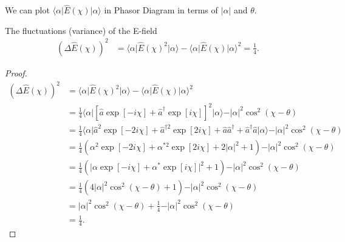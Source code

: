 \documentclass[../../note.tex]{subfiles}
\begin{document}
We can plot $ \langle \alpha \vert \hat{E}(\chi) \vert \alpha \rangle $ in Phasor Diagram in terms of $\vert \alpha \vert$ and $\theta$.

\begin{lemma}
    The fluctuations (variance) of the E-field 
    \begin{align}
        (\Delta \hat{E}(\chi))^2
        &= \langle \alpha \vert \hat{E}(\chi)^2\vert \alpha \rangle - \langle \alpha \vert \hat{E}(\chi) \vert \alpha \rangle^2 = \frac{1}{4}.
    \end{align}
\end{lemma}
\begin{proof}
    \begin{align}
        (\Delta \hat{E}(\chi))^2
        &= \langle \alpha \vert \hat{E}(\chi)^2\vert \alpha \rangle - \langle \alpha \vert \hat{E}(\chi) \vert \alpha \rangle^2 \\
        &= \frac{1}{4} \langle \alpha \vert \left[\hat{a}\exp\left[-i \chi\right] + \hat{a}^\dagger \exp\left[i \chi\right]\right]^2 \vert \alpha \rangle - \vert \alpha \vert^2 \cos^2\left(\chi - \theta \right) \\
        &= \frac{1}{4} \langle \alpha \vert \hat{a}^2 \exp\left[-2 i \chi\right] + \hat{a}^{\dagger 2} \exp\left[2 i \chi \right] + \hat{a} \hat{a}^\dagger + \hat{a}^\dagger \hat{a} \vert \alpha \rangle - \vert \alpha \vert^2 \cos^2\left(\chi - \theta \right) \\
        &= \frac{1}{4} \left(\alpha^2 \exp\left[-2 i \chi\right] + \alpha^{\ast 2} \exp\left[2 i \chi\right] + 2 \vert \alpha \vert^2 + 1 \right) - \vert \alpha \vert^2 \cos^2\left(\chi - \theta \right) \\
        &= \frac{1}{4} \left(\vert \alpha \exp\left[-i \chi \right] + \alpha^\ast \exp\left[i \chi \right]\vert^2 + 1\right) - \vert \alpha \vert^2 \cos^2\left(\chi - \theta \right) \\
        &= \frac{1}{4} \left(4 \vert \alpha \vert^2 \cos^2(\chi - \theta) + 1 \right)- \vert \alpha \vert^2 \cos^2\left(\chi - \theta \right) \\
        &= \vert \alpha \vert^2\cos^2\left(\chi - \theta \right) + \frac{1}{4} - \vert \alpha \vert^2 \cos^2\left(\chi - \theta \right) \\
        &= \frac{1}{4}.
    \end{align}
\end{proof}
\end{document}
